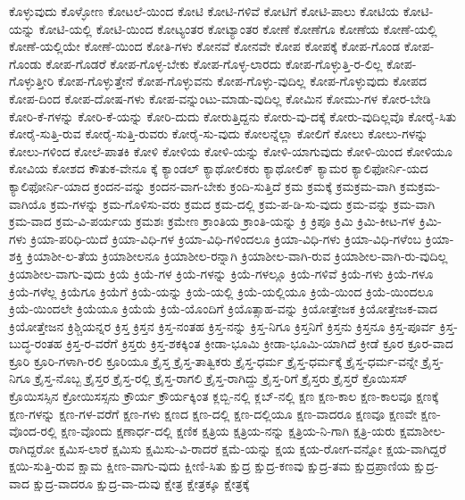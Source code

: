{ಕೊಳ್ಳುವುದು
ಕೊಳ್ಳೋಣ
ಕೋಟಲೆ-ಯಿಂದ
ಕೋಟಿ
ಕೋಟಿ-ಗಳಿವೆ
ಕೋಟಿಗೆ
ಕೋಟಿ-ಪಾಲು
ಕೋಟಿಯ
ಕೋಟಿ-ಯನ್ನು
ಕೋಟಿ-ಯಲ್ಲಿ
ಕೋಟಿ-ಯಿಂದ
ಕೋಟ್ಯಂತರ
ಕೋಟ್ಯಾಂತರ
ಕೋಣೆ
ಕೋಣೆಗೂ
ಕೋಣೆಯ
ಕೋಣೆ-ಯಲ್ಲಿ
ಕೋಣೆ-ಯಲ್ಲಿಯೇ
ಕೋಣೆ-ಯಿಂದ
ಕೋತಿ-ಗಳು
ಕೋನವೆ
ಕೋನವೇ
ಕೋಪ
ಕೋಪಕ್ಕೆ
ಕೋಪ-ಗೊಂಡ
ಕೋಪ-ಗೊಂಡು
ಕೋಪ-ಗೊಡರೆ
ಕೋಪ-ಗೊಳ್ಳ-ಬೇಕು
ಕೋಪ-ಗೊಳ್ಳ-ಲಾರದು
ಕೋಪ-ಗೊಳ್ಳುತ್ತಿ-ರ-ಲಿಲ್ಲ
ಕೋಪ-ಗೊಳ್ಳುತ್ತೀರಿ
ಕೋಪ-ಗೊಳ್ಳುತ್ತೇನೆ
ಕೋಪ-ಗೊಳ್ಳುವನು
ಕೋಪ-ಗೊಳ್ಳು-ವುದಿಲ್ಲ
ಕೋಪ-ಗೊಳ್ಳುವುದು
ಕೋಪದ
ಕೋಪ-ದಿಂದ
ಕೋಪ-ದೋಷ-ಗಳು
ಕೋಪ-ವನ್ನುಂಟು-ಮಾಡು-ವುದಿಲ್ಲ
ಕೋಮಿನ
ಕೋಮು-ಗಳ
ಕೋರ-ಬೇಡಿ
ಕೋರಿ-ಕೆ-ಗಳನ್ನು
ಕೋರಿ-ಕೆ-ಯನ್ನು
ಕೋರಿ-ದುದು
ಕೋರುತ್ತಿದ್ದನು
ಕೋರು-ವು-ದಕ್ಕೆ
ಕೋರು-ವುದಿಲ್ಲವೊ
ಕೋರೈ-ಸಿತು
ಕೋರೈ-ಸುತ್ತಿ-ರುವ
ಕೋರೈ-ಸುತ್ತಿ-ರುವರು
ಕೋರೈ-ಸು-ವುದು
ಕೋಲನ್ನೆಲ್ಲಾ
ಕೋಲಿಗೆ
ಕೋಲು
ಕೋಲು-ಗಳನ್ನು
ಕೋಲು-ಗಳಿಂದ
ಕೋಲೆ-ಪಾತಕಿ
ಕೋಳಿ
ಕೋಳಿಯ
ಕೋಳಿ-ಯನ್ನು
ಕೋಳಿ-ಯಾಗುವುದು
ಕೋಳಿ-ಯಿಂದ
ಕೋಳಿಯೂ
ಕೋವಿಯ
ಕೋಶದ
ಕೌತುಕ-ವೇನೂ
ಕ್ಕೆ
ಕ್ಯಾಂಡಲ್
ಕ್ಯಾಥೋಲಿಕರು
ಕ್ಯಾಥೋಲಿಕ್
ಕ್ಯಾಮರ
ಕ್ಯಾಲಿಫೋರ್ನಿ-ಯದ
ಕ್ಯಾಲಿಫೋರ್ನಿ-ಯಾದ
ಕ್ರಂದನ-ವನ್ನು
ಕ್ರಂದನ-ವಾಗ-ಬೇಕು
ಕ್ರಂದಿ-ಸುತ್ತಿದೆ
ಕ್ರಮ
ಕ್ರಮಕ್ಕೆ
ಕ್ರಮಕ್ರಮ-ವಾಗಿ
ಕ್ರಮಕ್ರಮ-ವಾಗಿಯೊ
ಕ್ರಮ-ಗಳನ್ನು
ಕ್ರಮ-ಗೊಳಿಸು-ವರು
ಕ್ರಮದ
ಕ್ರಮ-ದಲ್ಲಿ
ಕ್ರಮ-ಪ-ಡಿ-ಸು-ವುದು
ಕ್ರಮ-ವನ್ನು
ಕ್ರಮ-ವಾಗಿ
ಕ್ರಮ-ವಾದ
ಕ್ರಮ-ವಿ-ಪರ್ಯಯ
ಕ್ರಮಶಃ
ಕ್ರಮೇಣ
ಕ್ರಾಂತಿಯ
ಕ್ರಾಂತಿ-ಯನ್ನು
ಕ್ರಿ
ಕ್ರಿಪೂ
ಕ್ರಿಮಿ
ಕ್ರಿಮಿ-ಕೀಟ-ಗಳ
ಕ್ರಿಮಿ-ಗಳು
ಕ್ರಿಯಾ-ಪರಿಧಿ-ಯಿದೆ
ಕ್ರಿಯಾ-ವಿಧಿ-ಗಳ
ಕ್ರಿಯಾ-ವಿಧಿ-ಗಳಿಂದಲೂ
ಕ್ರಿಯಾ-ವಿಧಿ-ಗಳು
ಕ್ರಿಯಾ-ವಿಧಿ-ಗಳೆಂಬ
ಕ್ರಿಯಾ-ಶಕ್ತಿ
ಕ್ರಿಯಾಶೀ-ಲ-ತೆಯ
ಕ್ರಿಯಾಶೀಲನೂ
ಕ್ರಿಯಾಶೀಲ-ರನ್ನಾಗಿ
ಕ್ರಿಯಾಶೀಲ-ವಾಗಿ-ರುವ
ಕ್ರಿಯಾಶೀಲ-ವಾಗಿ-ರು-ವುದಿಲ್ಲ
ಕ್ರಿಯಾಶೀಲ-ವಾಗು-ವುದು
ಕ್ರಿಯೆ
ಕ್ರಿಯೆ-ಗಳ
ಕ್ರಿಯೆ-ಗಳನ್ನು
ಕ್ರಿಯೆ-ಗಳಲ್ಲೂ
ಕ್ರಿಯೆ-ಗಳಿವೆ
ಕ್ರಿಯೆ-ಗಳು
ಕ್ರಿಯೆ-ಗಳೂ
ಕ್ರಿಯೆ-ಗಳೆಲ್ಲ
ಕ್ರಿಯೆಗೂ
ಕ್ರಿಯೆಗೆ
ಕ್ರಿಯೆ-ಯನ್ನು
ಕ್ರಿಯೆ-ಯಲ್ಲಿ
ಕ್ರಿಯೆ-ಯಲ್ಲಿಯೂ
ಕ್ರಿಯೆ-ಯಿಂದ
ಕ್ರಿಯೆ-ಯಿಂದಲೂ
ಕ್ರಿಯೆ-ಯಿಂದಲೇ
ಕ್ರಿಯೆಯೂ
ಕ್ರಿಯೆಯೆ
ಕ್ರಿಯೆ-ಯೊಂದಿಗೆ
ಕ್ರಿಯೊತ್ಸಾಹ-ವನ್ನು
ಕ್ರಿಯೋತ್ತೇಜಕ
ಕ್ರಿಯೋತ್ತೇಜಕ-ವಾದ
ಕ್ರಿಯೋತ್ತೇಜನ
ಕ್ರಿಶ್ಚಿಯನ್ನರ
ಕ್ರಿಸ್ತ
ಕ್ರಿಸ್ತನ
ಕ್ರಿಸ್ತ-ನಂತಹ
ಕ್ರಿಸ್ತ-ನನ್ನು
ಕ್ರಿಸ್ತ-ನಿಗೂ
ಕ್ರಿಸ್ತನಿಗೆ
ಕ್ರಿಸ್ತನು
ಕ್ರಿಸ್ತನೂ
ಕ್ರಿಸ್ತ-ಪೂರ್ವ
ಕ್ರಿಸ್ತ-ಬುದ್ಧ-ರಂತಹ
ಕ್ರಿಸ್ತ-ರ-ವರೆಗೆ
ಕ್ರಿಸ್ತರು
ಕ್ರಿಸ್ತ-ಶಕಕ್ಕಿಂತ
ಕ್ರೀಡಾ-ಭೂಮಿ
ಕ್ರೀಡಾ-ಭೂಮಿ-ಯಾಗಿದೆ
ಕ್ರೀಡೆ
ಕ್ರೂರ
ಕ್ರೂರ-ವಾದ
ಕ್ರೂರಿ
ಕ್ರೂರಿ-ಗಳಾಗಿ-ರಲಿ
ಕ್ರೂರಿಯೂ
ಕ್ರೈಸ್ತ
ಕ್ರೈಸ್ತ-ತಾತ್ವಿಕರು
ಕ್ರೈಸ್ತ-ಧರ್ಮ
ಕ್ರೈಸ್ತ-ಧರ್ಮಕ್ಕೆ
ಕ್ರೈಸ್ತ-ಧರ್ಮ-ವನ್ನೇ
ಕ್ರೈಸ್ತ-ನಿಗೂ
ಕ್ರೈಸ್ತ-ನೊಬ್ಬ
ಕ್ರೈಸ್ತರ
ಕ್ರೈಸ್ತ-ರಲ್ಲಿ
ಕ್ರೈಸ್ತ-ರಾಗಲಿ
ಕ್ರೈಸ್ತ-ರಾಗಿದ್ದು
ಕ್ರೈಸ್ತ-ರಿಗೆ
ಕ್ರೈಸ್ತರು
ಕ್ರೈಸ್ತರೆ
ಕ್ರೊಯಿಸಸ್
ಕ್ರೊಯಿಸಸ್ಸಿನ
ಕ್ರೋಯಿಸಸ್ಸನು
ಕ್ರೌರ್ಯ
ಕ್ರೌರ್ಯಕ್ಕಿಂತ
ಕ್ಲಬ್ಬಿ-ನಲ್ಲಿ
ಕ್ಲಬ್-ನಲ್ಲಿ
ಕ್ಷಣ
ಕ್ಷಣ-ಕಾಲ
ಕ್ಷಣ-ಕಾಲವೂ
ಕ್ಷಣಕ್ಕೆ
ಕ್ಷಣ-ಗಳನ್ನು
ಕ್ಷಣ-ಗಳ-ವರೆಗೆ
ಕ್ಷಣ-ಗಳು
ಕ್ಷಣದ
ಕ್ಷಣ-ದಲ್ಲಿ
ಕ್ಷಣ-ದಲ್ಲಿಯೂ
ಕ್ಷಣ-ವಾದರೂ
ಕ್ಷಣವೂ
ಕ್ಷಣವೇ
ಕ್ಷಣ-ವೊಂದ-ರಲ್ಲಿ
ಕ್ಷಣ-ವೊಂದು
ಕ್ಷಣಾರ್ಧ-ದಲ್ಲಿ
ಕ್ಷಣಿಕ
ಕ್ಷತ್ರಿಯ
ಕ್ಷತ್ರಿಯ-ನನ್ನು
ಕ್ಷತ್ರಿಯ-ನಿ-ಗಾಗಿ
ಕ್ಷತ್ರಿ-ಯರು
ಕ್ಷಮಾಶೀಲ-ರಾಗಿದ್ದರೋ
ಕ್ಷಮಿಸ-ಲಾರೆ
ಕ್ಷಮಿಸು
ಕ್ಷಮಿಸು-ವಿ-ರಾದರೆ
ಕ್ಷಮೆ-ಯನ್ನು
ಕ್ಷಯ
ಕ್ಷಯ-ರೋಗ-ವನ್ನೋ
ಕ್ಷಯ-ವಾಗಿದ್ದರೆ
ಕ್ಷಯಿ-ಸುತ್ತಿ-ರುವ
ಕ್ಷಾಮ
ಕ್ಷೀಣ-ವಾಗು-ವುದು
ಕ್ಷೀಣಿ-ಸಿತು
ಕ್ಷುದ್ರ
ಕ್ಷುದ್ರ-ಕಣವು
ಕ್ಷುದ್ರ-ತಮ
ಕ್ಷುದ್ರಪ್ರಾಣಿಯ
ಕ್ಷುದ್ರ-ವಾದ
ಕ್ಷುದ್ರ-ವಾದರೂ
ಕ್ಷುದ್ರ-ವಾ-ದುವು
ಕ್ಷೇತ್ರ
ಕ್ಷೇತ್ರಕ್ಕೂ
ಕ್ಷೇತ್ರಕ್ಕೆ
}

